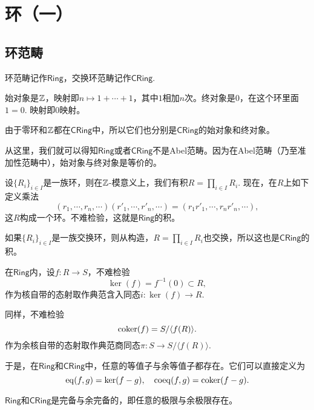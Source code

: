 \chapter{环（一）}

\section{环范畴}

环范畴记作$\mathsf{Ring}$，交换环范畴记作$\mathsf{CRing}$. 

\begin{para}[始对象与终对象]
始对象是$\mathbb{Z}$，映射即$n\mapsto 1+\cdots+1$，其中$1$相加$n$次。终对象是$0$，在这个环里面$1=0$. 映射即$0$映射。

由于零环和$\mathbb{Z}$都在$\mathsf{CRing}$中，所以它们也分别是$\mathsf{CRing}$的始对象和终对象。
\end{para}

从这里，我们就可以得知$\mathsf{Ring}$或者$\mathsf{CRing}$不是Abel范畴。因为在Abel范畴（乃至准加性范畴中），始对象与终对象是等价的。

\begin{para}[积]
设$\{R_i\}_{i\in I}$是一族环，则在$\mathbb{Z}$-模意义上，我们有积$R=\prod_{i\in I}R_i$. 现在，在$R$上如下定义乘法
\[
	(r_1,\cdots,r_n,\cdots)(r'_1,\cdots,r'_n,\cdots)=(r_1r'_1,\cdots,r_nr'_n,\cdots),
\]
这$R$构成一个环。不难检验，这就是$\mathsf{Ring}$的积。

如果$\{R_i\}_{i\in I}$是一族交换环，则从构造，$R=\prod_{i\in I}R_i$也交换，所以这也是$\mathsf{CRing}$的积。
\end{para}

\begin{para}[余积]

\end{para}


\begin{para}[核与余核]
在$\mathsf{Ring}$内，设$f:R\to S$，不难检验
\[
	\ker(f)=f^{-1}(0)\subset R,
\]
作为核自带的态射取作典范含入同态$i:\ker(f)\to R$.

同样，不难检验
\[
	\operatorname{coker}(f)=S/\langle f(R)\rangle.
\]
作为余核自带的态射取作典范商同态$\pi:S\to S/\langle f(R)\rangle$.
\end{para}

于是，在$\mathsf{Ring}$和$\mathsf{CRing}$中，任意的等值子与余等值子都存在。它们可以直接定义为
\[
	\operatorname{eq}(f,g)=\ker(f-g),\quad \operatorname{coeq}(f,g)=\operatorname{coker}(f-g).
\]

\begin{thm}
$\mathsf{Ring}$和$\mathsf{CRing}$是完备与余完备的，即任意的极限与余极限存在。
\end{thm}

